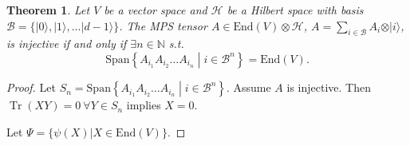 \documentclass{article}
\newtheorem{theorem}{Theorem}
\newcommand{\tr}{\operatorname{Tr}}
\newcommand{\End}{\mathrm{End}}
\newcommand{\ket}[1]{\vert #1 \rangle}
\newcommand{\Span}{\mathrm{Span}}
\begin{document}
\begin{theorem}
  Let $V$ be a vector space and $\mathcal{H}$ be a Hilbert space with basis $\mathcal{B} = \{\ket{0},\ket{1},\dots \ket{d-1}\}$. The MPS tensor $A\in \End(V)\otimes \mathcal{H}$, $A = \sum_{i\in \mathcal{B}} A_i \otimes \ket{i}$, is injective if and only if $\exists n\in \mathbb{N}$ s.t.
  \begin{equation*}
  	\Span\left\{A_{i_1} A_{i_2} \dots A_{i_n} \middle| i\in \mathcal{B}^n \right\} = \End(V).
  \end{equation*}
\end{theorem}

\begin{proof}
	Let $S_n = \Span\left\{A_{i_1} A_{i_2} \dots A_{i_n} \middle| i\in \mathcal{B}^n \right\}$. Assume $A$ is injective. Then $\tr (XY) = 0 \ \forall Y\in S_n$ implies $X=0$. 
	
	Let $\Psi = \{\psi(X)|X\in \End(V)\}$. 
\end{proof}
\end{document}
